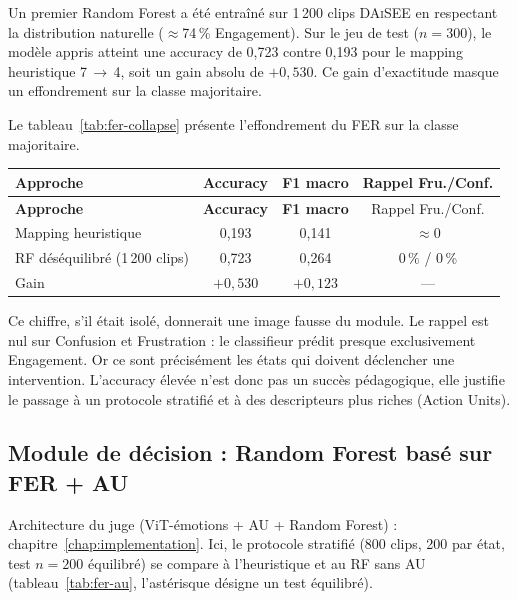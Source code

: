 Un premier Random Forest a été entraîné sur 1\,200 clips \textsc{DAiSEE}
en respectant la distribution naturelle ($\approx$74\,\% Engagement). Sur
le jeu de test ($n=300$), le modèle appris atteint une accuracy de
0{,}723 contre 0{,}193 pour le mapping heuristique 7\,$\rightarrow$\,4,
soit un gain absolu de $+0{,}530$.
Ce gain d'exactitude masque un effondrement sur la classe
majoritaire.

Le tableau~\ref{tab:fer-collapse} présente l'effondrement du FER sur la classe majoritaire.

{\small
\renewcommand{\arraystretch}{1.18}
\setlength{\tabcolsep}{4pt}
\begin{xltabular}{\textwidth}{|>{\raggedright\arraybackslash}X|c|c|c|}
\hline
{}
\textbf{Approche} & \textbf{Accuracy} & \textbf{F1 macro} &
Rappel Fru./Conf. \\
\hline
\endfirsthead
\hline
{}
\textbf{Approche} & \textbf{Accuracy} & \textbf{F1 macro} &
Rappel Fru./Conf. \\
\hline
\endhead
\endfoot
\endlastfoot
Mapping heuristique & 0{,}193 & 0{,}141 & $\approx 0$ \\
\hline
RF déséquilibré (1\,200 clips) & 0{,}723 & 0{,}264 &
0\,\% / 0\,\% \\
\hline
Gain & $+0{,}530$ & $+0{,}123$ & --- \\
\hline
\end{xltabular}
\label{tab:fer-collapse}
}


Ce chiffre, s'il était isolé, donnerait une image fausse du module. Le
rappel est nul sur Confusion et Frustration : le classifieur
prédit presque exclusivement Engagement. Or ce sont précisément les états
qui doivent déclencher une intervention. L'accuracy élevée n'est donc pas
un succès pédagogique, elle justifie le passage à un protocole stratifié et à des descripteurs plus riches (Action Units).

\subsection{Module de décision : Random Forest basé sur FER + AU}
\label{subsec:val-fer-au}

Architecture du juge (ViT-émotions + AU + Random Forest) :
chapitre~\ref{chap:implementation}. Ici, le protocole
stratifié (800 clips, 200 par état, test $n=200$ équilibré)
se compare à l'heuristique et au RF sans AU
(tableau~\ref{tab:fer-au}, l'astérisque désigne un test équilibré).

